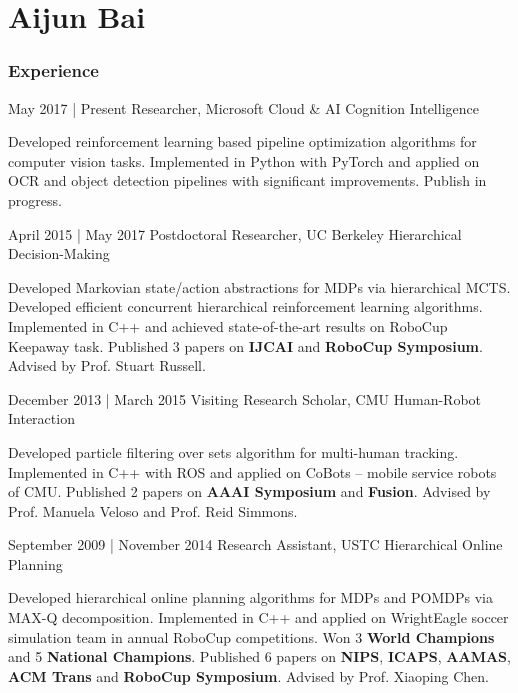 \documentclass[fontsize=10pt]{tccv}
\begin{document}
\part{Aijun Bai}

\section{Experience}

\begin{eventlist}

	\item{May 2017 | Present}
	      {Researcher, Microsoft Cloud \& AI}
	      {Cognition Intelligence}

	Developed reinforcement learning based pipeline optimization algorithms for computer vision tasks. Implemented in Python with PyTorch and applied on OCR and object detection pipelines with significant improvements. Publish in progress.

	\item{April 2015 | May 2017}
	      {Postdoctoral Researcher, UC Berkeley}
	      {Hierarchical Decision-Making}

	Developed Markovian state/action abstractions for MDPs via hierarchical MCTS.  Developed efficient concurrent hierarchical reinforcement learning algorithms. Implemented in C++ and achieved state-of-the-art results on RoboCup Keepaway task. Published 3 papers on \textbf{IJCAI} and \textbf{RoboCup Symposium}. Advised by Prof. Stuart Russell.

	\item{December 2013 | March 2015}
	      {Visiting Research Scholar, CMU}
	      {Human-Robot Interaction}

	Developed particle filtering over sets algorithm for multi-human tracking. Implemented in C++ with ROS and applied on CoBots -- mobile service robots of CMU. Published 2 papers on \textbf{AAAI Symposium} and \textbf{Fusion}. Advised by Prof. Manuela Veloso and Prof. Reid Simmons.

	\item{September 2009 | November 2014}
	      {Research Assistant, USTC}
	      {Hierarchical Online Planning}

	Developed hierarchical online planning algorithms for MDPs and POMDPs via MAX-Q decomposition. Implemented in C++ and applied on WrightEagle soccer simulation team in annual RoboCup competitions. Won 3 \textbf{World Champions} and 5 \textbf{National Champions}.  Published 6 papers on \textbf{NIPS}, \textbf{ICAPS}, \textbf{AAMAS}, \textbf{ACM Trans} and \textbf{RoboCup  Symposium}. Advised by Prof. Xiaoping Chen.

\end{eventlist}
\end{document}

